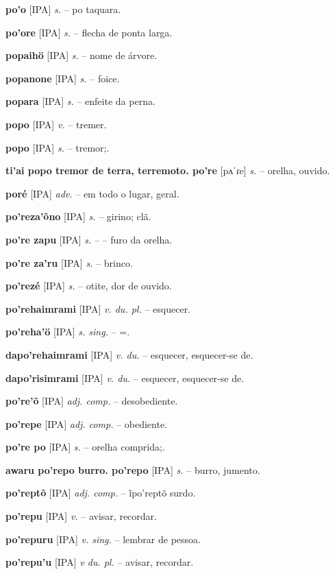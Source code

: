 \textbf{po'o} [IPA] \textit{s.} -- po taquara.

\textbf{po'ore} [IPA] \textit{s.} -- flecha de ponta larga.

\textbf{popaihö} [IPA] \textit{s.} -- nome de árvore.

\textbf{popanone} [IPA] \textit{s.} -- foice.

\textbf{popara} [IPA] \textit{s.} -- enfeite da perna.

\textbf{popo} [IPA] \textit{v.} -- tremer.

\textbf{popo} [IPA] \textit{s.} -- tremor;.

\textbf{ti'ai popo tremor de terra, terremoto. po're} [pʌˈɾe] \textit{s.} -- orelha, ouvido.

\textbf{poré} [IPA] \textit{adv.} -- em todo o lugar, geral.

\textbf{po'reza'õno} [IPA] \textit{s.} -- girino; clã.

\textbf{po're zapu} [IPA] \textit{s.} -- -- furo da orelha.

\textbf{po're za'ru} [IPA] \textit{s.} -- brinco.

\textbf{po'rezé} [IPA] \textit{s.} -- otite, dor de ouvido.

\textbf{po'rehaimrami} [IPA] \textit{v. du. pl.} -- esquecer.

\textbf{po'reha'ö} [IPA] \textit{s. sing.} -- =.

\textbf{dapo'rehaimrami} [IPA] \textit{v. du.} -- esquecer, esquecer-se de.

\textbf{dapo'risimrami} [IPA] \textit{v. du.} -- esquecer, esquecer-se de. \href{https://xavante.pythonanywhere.com/static/dicionario/play.html?file=forget.wav}{\faHeadphones}

\textbf{po're'õ} [IPA] \textit{adj. comp.} -- desobediente.

\textbf{po'repe} [IPA] \textit{adj. comp.} -- obediente.

\textbf{po're po} [IPA] \textit{s.} -- orelha comprida;.

\textbf{awaru po'repo burro. po'repo} [IPA] \textit{s.} -- burro, jumento.

\textbf{po'reptõ} [IPA] \textit{adj. comp.} -- ĩpo'reptõ surdo.

\textbf{po'repu} [IPA] \textit{v.} -- avisar, recordar.

\textbf{po'repuru} [IPA] \textit{v. sing.} -- lembrar de pessoa.

\textbf{po'repu'u} [IPA] \textit{v du. pl.} -- avisar, recordar.

